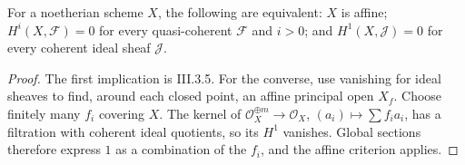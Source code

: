\begin{theorem}
\label{ha-ch3-thm-serre-affine}
For a noetherian scheme $X$, the following are equivalent: $X$ is affine;
$H^i(X,\mathcal F)=0$ for every quasi-coherent $\mathcal F$ and $i>0$; and
$H^1(X,\mathcal J)=0$ for every coherent ideal sheaf $\mathcal J$.

\end{theorem}
\begin{proof}

The first implication is III.3.5.  For the converse, use vanishing for ideal
sheaves to find, around each closed point, an affine principal open $X_f$.
Choose finitely many $f_i$ covering $X$.  The kernel of
$\mathcal O_X^{\oplus m}\to\mathcal O_X$, $(a_i)\mapsto\sum f_i a_i$,
has a filtration with coherent ideal quotients, so its $H^1$ vanishes.  Global
sections therefore express $1$ as a combination of the $f_i$, and the affine
criterion applies.

\end{proof}

